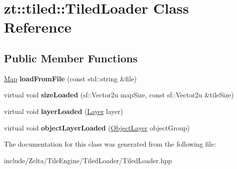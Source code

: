 \hypertarget{classzt_1_1tiled_1_1_tiled_loader}{}\section{zt\+:\+:tiled\+:\+:Tiled\+Loader Class Reference}
\label{classzt_1_1tiled_1_1_tiled_loader}
\subsection*{Public Member Functions}
\begin{DoxyCompactItemize}
\item 
\mbox{\label{classzt_1_1tiled_1_1_tiled_loader_a4dcb166aef23c58af56d06ecb658240f}} 
\hyperlink{classzt_1_1tiled_1_1_map}{Map} {\bfseries load\+From\+File} (const std\+::string \&file)
\item 
\mbox{\label{classzt_1_1tiled_1_1_tiled_loader_a1f893b1c6e8eb87c494468bad25fd08d}} 
virtual void {\bfseries size\+Loaded} (sf\+::\+Vector2u map\+Size, const sf\+::\+Vector2u \&tile\+Size)
\item 
\mbox{\label{classzt_1_1tiled_1_1_tiled_loader_abe1f0dfb3a7028bbc6d7e5ca0eefe1d1}} 
virtual void {\bfseries layer\+Loaded} (\hyperlink{classzt_1_1tiled_1_1_layer}{Layer} layer)
\item 
\mbox{\label{classzt_1_1tiled_1_1_tiled_loader_a9dc3e335436c2a099c109617ea9ef366}} 
virtual void {\bfseries object\+Layer\+Loaded} (\hyperlink{classzt_1_1tiled_1_1_object_layer}{Object\+Layer} object\+Group)
\end{DoxyCompactItemize}


The documentation for this class was generated from the following file\+:\begin{DoxyCompactItemize}
\item 
include/\+Zelta/\+Tile\+Engine/\+Tiled\+Loader/Tiled\+Loader.\+hpp\end{DoxyCompactItemize}
